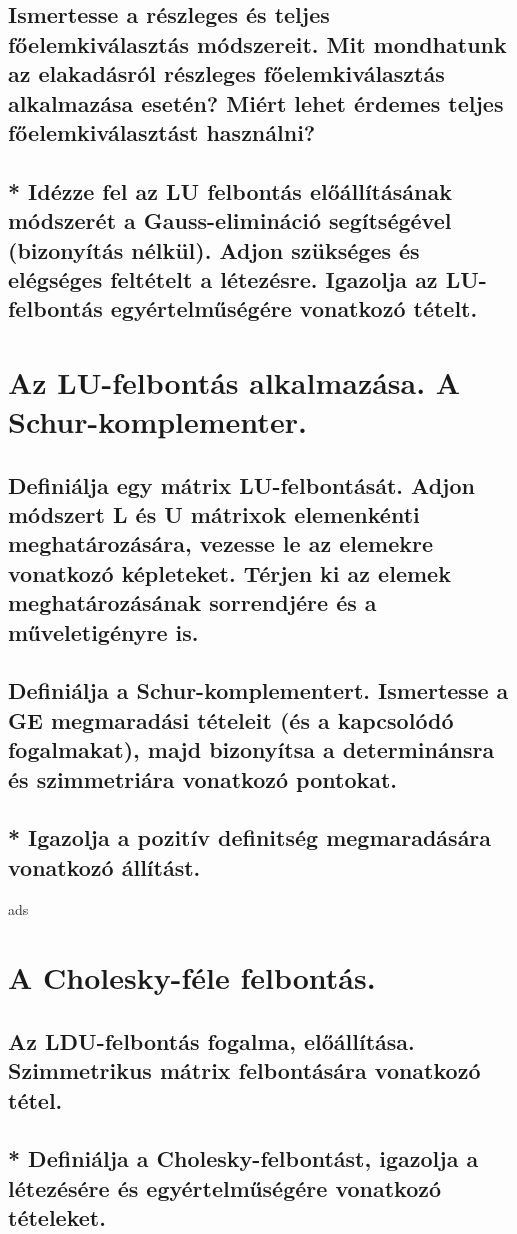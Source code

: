 \documentclass{article}
\begin{document}
        \subsection{Ismertesse a részleges és teljes főelemkiválasztás módszereit. Mit mondhatunk az elakadásról részleges főelemkiválasztás alkalmazása esetén? Miért lehet érdemes teljes főelemkiválasztást használni?}
        \subsection{* Idézze fel az LU felbontás előállításának módszerét a Gauss-elimináció segítségével (bizonyítás nélkül). Adjon szükséges és elégséges feltételt a létezésre. Igazolja az LU-felbontás egyértelműségére vonatkozó tételt.}


    \section{Az LU-felbontás alkalmazása. A Schur-komplementer.}
        \subsection{Definiálja egy mátrix LU-felbontását. Adjon módszert L és U mátrixok elemenkénti meghatározására, vezesse le az elemekre vonatkozó képleteket. Térjen ki az elemek meghatározásának sorrendjére és a műveletigényre is.}
        \subsection{Definiálja a Schur-komplementert. Ismertesse a GE megmaradási tételeit (és a kapcsolódó fogalmakat), majd bizonyítsa a determinánsra és szimmetriára vonatkozó pontokat.}
        \subsection{* Igazolja a pozitív definitség megmaradására vonatkozó állítást.}
    
ads
    \section{A Cholesky-féle felbontás.}
        \subsection{Az LDU-felbontás fogalma, előállítása. Szimmetrikus mátrix felbontására vonatkozó tétel.}
        \subsection{* Definiálja a Cholesky-felbontást, igazolja a létezésére és egyértelműségére vonatkozó tételeket.}
\end{document}

